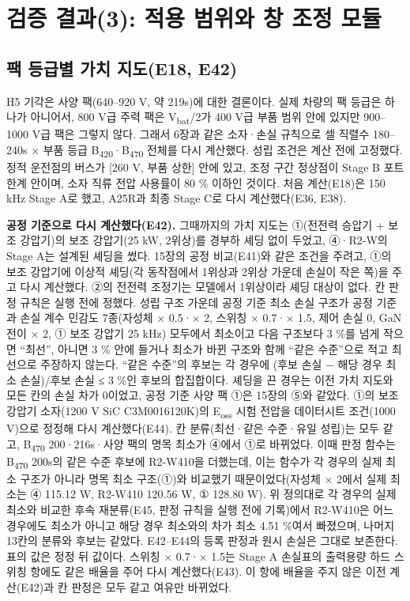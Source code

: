 \chapter{검증 결과(3): 적용 범위와 창 조정 모듈}

\section{팩 등급별 가치 지도(E18, E42)}

H5 기각은 사양 팩(640–920 V, 약 219s)에 대한 결론이다. 실제 차량의 팩 등급은 하나가 아니어서, 800 V급 주력 팩은 V\textsubscript{bat}/2가 400 V급 부품 범위 안에 있지만 900–1000 V급 팩은 그렇지 않다. 그래서 6장과 같은 소자·손실 규칙으로 셀 직렬수 180–240s × 부품 등급 B\textsubscript{420}·B\textsubscript{470} 전체를 다시 계산했다. 성립 조건은 계산 전에 고정했다. 정적 운전점의 버스가 [260 V, 부품 상한] 안에 있고, 조정 구간 정상점이 Stage B 포트 한계 안이며, 소자 직류 전압 사용률이 80 \% 이하인 것이다. 처음 계산(E18)은 150 kHz Stage A로 했고, A25R과 최종 Stage C로 다시 계산했다(E36, E38).

\textbf{공정 기준으로 다시 계산했다(E42).} 그때까지의 가치 지도는 ①(전전력 승압기 + 보조 강압기)의 보조 강압기(25 kW, 2위상)를 경부하 셰딩 없이 두었고, ④·R2-W의 Stage A는 설계된 셰딩을 썼다. 15장의 공정 비교(E41)와 같은 조건을 주려고, ①의 보조 강압기에 이상적 셰딩(각 동작점에서 1위상과 2위상 가운데 손실이 작은 쪽)을 주고 다시 계산했다. ②의 전전력 조정기는 모델에서 1위상이라 셰딩 대상이 없다. 칸 판정 규칙은 실행 전에 정했다. 성립 구조 가운데 공정 기준 최소 손실 구조가 공정 기준과 손실 계수 민감도 7종(자성체 × 0.5·× 2, 스위칭 × 0.7·× 1.5, 제어 손실 0, GaN 전이 × 2, ① 보조 강압기 25 kHz) 모두에서 최소이고 다음 구조보다 3 \%를 넘게 작으면 “최선”, 아니면 3 \% 안에 들거나 최소가 바뀐 구조와 함께 “같은 수준”으로 적고 최선으로 주장하지 않는다. “같은 수준”의 후보는 각 경우에 (후보 손실 − 해당 경우 최소 손실)/후보 손실 ≤ 3 \%인 후보의 합집합이다. 셰딩을 끈 경우는 이전 가치 지도와 모든 칸의 손실 차가 0이었고, 공정 기준 사양 팩 ①은 15장의 ⑤와 같았다. ①의 보조 강압기 소자(1200 V SiC C3M0016120K)의 E\textsubscript{oss} 시험 전압을 데이터시트 조건(1000 V)으로 정정해 다시 계산했다(E44). 칸 분류(최선·같은 수준·유일 성립)는 모두 같고, B\textsubscript{470} 200·216s·사양 팩의 명목 최소가 ④에서 ①로 바뀌었다. 이때 판정 함수는 B\textsubscript{470} 200s의 같은 수준 후보에 R2-W410을 더했는데, 이는 함수가 각 경우의 실제 최소 구조가 아니라 명목 최소 구조(①)와 비교했기 때문이었다(자성체 × 2에서 실제 최소는 ④ 115.12 W, R2-W410 120.56 W, ① 128.80 W). 위 정의대로 각 경우의 실제 최소와 비교한 후속 재분류(E45, 판정 규칙을 실행 전에 기록)에서 R2-W410은 어느 경우에도 최소가 아니고 해당 경우 최소와의 차가 최소 4.51 \%여서 빠졌으며, 나머지 13칸의 분류와 후보는 같았다. E42–E44의 등록 판정과 원시 손실은 그대로 보존한다. 표의 값은 정정 뒤 값이다. 스위칭 × 0.7·× 1.5는 Stage A 손실표의 출력용량 하드 스위칭 항에도 같은 배율을 주어 다시 계산했다(E43). 이 항에 배율을 주지 않은 이전 계산(E42)과 칸 판정은 모두 같고 여유만 바뀌었다.

